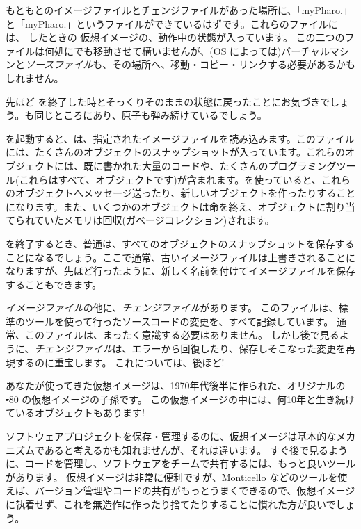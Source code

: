 \documentclass[a4paper,10pt,twoside]{book}
\begin{document}
もともとのイメージファイルとチェンジファイルがあった場所に、「myPharo.」と「myPharo.」というファイルができているはずです。これらのファイルには、 したときの \pharo 仮想イメージの、動作中の状態が入っています。
この二つのファイルは何処にでも移動させて構いませんが、(OS によっては)バーチャルマシンと\emph{ソースファイル}も、その場所へ、移動・コピー・リンクする必要があるかもしれません。


先ほど \pharo を終了した時とそっくりそのままの状態に戻ったことにお気づきでしょう。\bam も同じところにあり、原子も弾み続けているでしょう。

\pharo を起動すると、\pharo {}は、指定されたイメージファイルを読み込みます。このファイルには、たくさんのオブジェクトのスナップショットが入っています。これらのオブジェクトには、既に書かれた大量のコードや、たくさんのプログラミングツール(これらはすべて、オブジェクトです)が含まれます。\pharo を使っていると、これらのオブジェクトへメッセージ送ったり、新しいオブジェクトを作ったりすることになります。また、いくつかのオブジェクトは命を終え、オブジェクトに割り当てられていたメモリは回収(\ie ガベージコレクション)されます。

\pharo を終了するとき、普通は、すべてのオブジェクトのスナップショットを保存することになるでしょう。ここで通常、古いイメージファイルは上書きされることになりますが、先ほど行ったように、新しく名前を付けてイメージファイルを保存することもできます。

\emph{イメージファイル}の他に、\emph{チェンジファイル}があります。
このファイルは、標準のツールを使って行ったソースコードの変更を、すべて記録しています。
通常、このファイルは、まったく意識する必要はありません。
しかし後で見るように、\emph{チェンジファイル}は、エラーから回復したり、保存しそこなった変更を再現するのに重宝します。
これについては、後ほど!

あなたが使ってきた仮想イメージは、1970年代後半に作られた、オリジナルの \st-80 の仮想イメージの子孫です。
この仮想イメージの中には、何10年と生き続けているオブジェクトもあります!

ソフトウェアプロジェクトを保存・管理するのに、仮想イメージは基本的なメカニズムであると考えるかも知れませんが、それは違います。
すぐ後で見るように、コードを管理し、ソフトウェアをチームで共有するには、もっと良いツールがあります。
仮想イメージは非常に便利ですが、Monticello などのツールを使えば、バージョン管理やコードの共有がもっとうまくできるので、仮想イメージに執着せず、これを無造作に作ったり捨てたりすることに慣れた方が良いでしょう。
\end{document}
